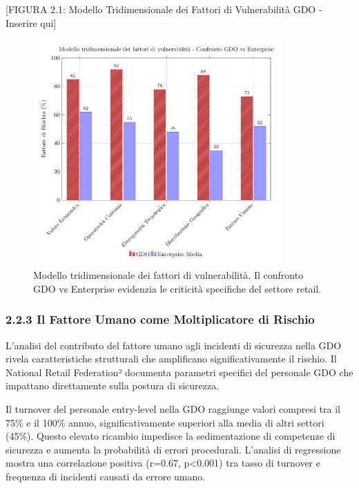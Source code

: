 \documentclass[12pt,a4paper,oneside]{book}
\begin{document}
{[}FIGURA 2.1: Modello Tridimensionale dei Fattori di Vulnerabilità GDO
- Inserire qui{]}
\begin{figure}[htbp]
    \centering
    \includegraphics[width=0.85\textwidth]{figura 2-1}
    \caption{Modello tridimensionale dei fattori di vulnerabilità. Il confronto GDO vs Enterprise evidenzia le criticità specifiche del settore retail.}
    \label{fig:vulnerabilita_gdo}
\end{figure}

\subsubsection{2.2.3 Il Fattore Umano come Moltiplicatore di
Rischio}\label{il-fattore-umano-come-moltiplicatore-di-rischio}

L'analisi del contributo del fattore umano agli incidenti di sicurezza
nella GDO rivela caratteristiche strutturali che amplificano
significativamente il rischio. Il National Retail Federation² documenta
parametri specifici del personale GDO che impattano direttamente sulla
postura di sicurezza.

Il turnover del personale entry-level nella GDO raggiunge valori
compresi tra il 75\% e il 100\% annuo, significativamente superiori alla
media di altri settori (45\%). Questo elevato ricambio impedisce la
sedimentazione di competenze di sicurezza e aumenta la probabilità di
errori procedurali. L'analisi di regressione mostra una correlazione
positiva (r=0.67, p\textless0.001) tra tasso di turnover e frequenza di
incidenti causati da errore umano.
\end{document}
